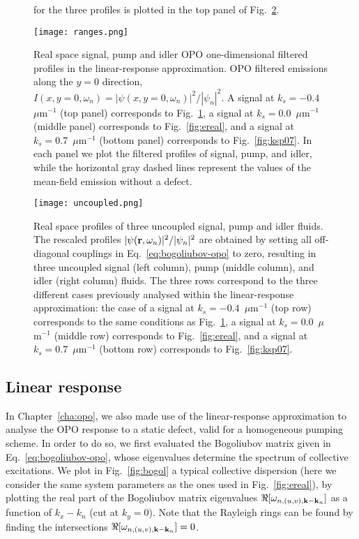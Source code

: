 \begin{subappendices}
\begin{figure}[tb]
{  for the three profiles is plotted in the top panel of
  Fig.~\ref{fig:range}.}
\label{fig:ksm04}
\end{figure}
%
\begin{figure}[tb]\centering
\texttt{[image: ranges.png]}
\caption{Real space signal, pump and idler OPO one-dimensional
  filtered profiles in the linear-response approximation. OPO filtered
  emissions along the $y=0$ direction,
  $I (x, y=0, \omega_n) = |\psi(x,y=0, \omega_n)|^2/|\psi_n|^2$.  A
  signal at $k_s = -0.4$~$\mu$m$^{-1}$ (top panel) corresponds to
  Fig.~\ref{fig:ksm04}, a signal at $k_s = 0.0$~$\mu$m$^{-1}$ (middle
  panel) corresponds to Fig.~\ref{fig:ereal}, and a signal at
  $k_s = 0.7$~$\mu$m$^{-1}$ (bottom panel) corresponds to
  Fig.~\ref{fig:ksp07}. In each panel we plot the filtered profiles of
  signal, pump, and idler, while the horizontal gray dashed lines
  represent the values of the mean-field emission without a defect.}
\label{fig:range}
\end{figure}
%
\begin{figure}[tb]\centering
\texttt{[image: uncoupled.png]}
\caption{Real space profiles of three uncoupled signal, pump and idler
  fluids. The rescaled profiles
  $|\psi (\mathbf{r},\omega_n)|^2/|\psi_n|^2$ are obtained by setting all
  off-diagonal couplings in Eq.~\eqref{eq:bogoliubov-opo} to zero,
  resulting in three uncoupled signal (left column), pump (middle
  column), and idler (right column) fluids. The three rows correspond
  to the three different cases previously analysed within the
  linear-response approximation: the case of a signal at
  $k_s = -0.4$~$\mu$m$^{-1}$ (top row) corresponds to the same
  conditions as Fig.~\ref{fig:ksm04}, a signal at
  $k_s = 0.0$~$\mu$m$^{-1}$ (middle row) corresponds to
  Fig.~\ref{fig:ereal}, and a signal at $k_s = 0.7$~$\mu$m$^{-1}$
  (bottom row) corresponds to Fig.~\ref{fig:ksp07}.}
\label{fig:uncou}
\end{figure}
%


\subsection{Linear response}
\label{subsec:analy}
%
In Chapter~\ref{cha:opo}, we also made use of the linear-response
approximation to analyse the OPO response to a static defect, valid
for a homogeneous pumping scheme. In order to do so, we first
evaluated the Bogoliubov matrix given in
Eq.~\eqref{eq:bogoliubov-opo}, whose eigenvalues determine the
spectrum of collective excitations. We plot in Fig.~\ref{fig:bogol} a
typical collective dispersion (here we consider the same system
parameters as the ones used in Fig.~\ref{fig:ereal}), by plotting the
real part of the Bogoliubov matrix eigenvalues
$\Re[\omega_{n,(u,v),\mathbf{k}-\mathbf{k}_n}]$ as a function of $k_x - k_n$
(cut at $k_y=0$). Note that the Rayleigh rings can be found by finding
the intersections $\Re[\omega_{n,(u,v),\mathbf{k}-\mathbf{k}_n}]=0$.


\end{subappendices}
